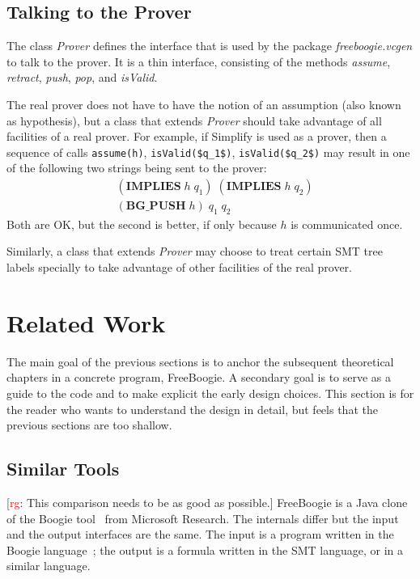 \documentclass{llncs}
\newcommand{\jmlCode}{\lstinline[style=jml,basicstyle=\normalsize]}
\newcommand{\rg}[1]{{\small [\textcolor{red}{rg}: #1]}}
\begin{document}
\subsection{Talking to the Prover} %

The class \textit{Prover} defines the interface that is used
by the package \textit{freeboogie.vcgen} to talk to the
prover. It is a thin interface, consisting of the methods
\textit{assume}, \textit{retract}, \textit{push}, \textit{pop},
and \textit{isValid}.

The real prover does not have to have the notion of an
assumption (also known as hypothesis), but a class that extends
\textit{Prover} should take advantage of all facilities of a real
prover. For example, if Simplify is used as a prover, then a
sequence of calls \jmlCode|assume(h)|, \jmlCode|isValid($q_1$)|,
\jmlCode|isValid($q_2$)| may result in one of the following two
strings being sent to the prover:
\begin{align}
&(\mathbf{IMPLIES}\;h\;q_1)\;(\mathbf{IMPLIES}\;h\;q_2)\\
&(\mathbf{BG\_PUSH}\;h)\;q_1\;q_2
\end{align}
Both are OK, but the second is better, if only because
$h$ is communicated once.

Similarly, a class that extends \textit{Prover} may choose to
treat certain SMT tree labels specially to take advantage of
other facilities of the real prover.

\section{Related Work} %

The main goal of the previous sections is to anchor the
subsequent theoretical chapters in a concrete program,
FreeBoogie. A secondary goal is to serve as a guide to the code
and to make explicit the early design choices. This section is
for the reader who wants to understand the design in detail, but
feels that the previous sections are too shallow.

\subsection{Similar Tools} %

\rg{This comparison needs to be as good as possible.}
FreeBoogie is a Java clone of the Boogie
tool~\cite{barnett2005boogie} from Microsoft Research. The
internals differ but the input and the output interfaces
are the same. The input is a program written in the Boogie
language~\cite{leino2008boogie,leino2010boogie}; the output is a
formula written in the SMT language, or in a similar language.
\end{document}
